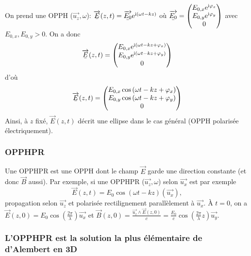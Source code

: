On prend une OPPH ($\vec{u_z},\omega$): $\ubar{\vec{E}}(z,t)=\ubar{\vec{E_0}}\rme^{\rmi\left(\omega t-kz\right)}$ où $\ubar{\vec{E_0}}=\begin{pmatrix}
    E_{0,x}\rme^{\rmi\varphi_x}\\E_{0,y}\rme^{\rmi\varphi_y}\\0
\end{pmatrix}$ avec $E_{0,x},E_{0,y}>0$. On a donc
\begin{equation*}
    \ubar{\vec{E}}(z,t)=\begin{pmatrix}
        E_{0,x}\rme^{\rmi\left(\omega t-kz+\varphi_x\right)}\\
        E_{0,y}\rme^{\rmi\left(\omega t-kz+\varphi_y\right)}\\
        0
    \end{pmatrix}
\end{equation*}
d'où
\begin{equation*}
    \ubar{\vec{E}}(z,t)=\begin{pmatrix}
        E_{0,x}\cos\left(\omega t-kz+\varphi_x\right)\\
        E_{0,y}\cos\left(\omega t-kz+\varphi_y\right)\\
        0
    \end{pmatrix}
\end{equation*}
Ainsi, à $z$ fixé, $\vec{E}(z,t)$ décrit une ellipse dans le cas général (OPPH polarisée électriquement).

\subsubsection{OPPHPR}
Une OPPHPR est une OPPH dont le champ $\vec{E}$ garde une direction constante (et donc $\vec{B}$ aussi). Par exemple, si une OPPHPR ($\vec{u_z},\omega$) selon $\vec{u_x}$ est par exemple
\begin{equation*}
    \boxed{
        \vec{E}(z,t)=E_0\cos(\omega t-kz)(\vec{u_x}),
    }
\end{equation*}
propagation selon $\vec{u_z}$ et polarisée rectilignement parallèlement à $\vec{u_x}$.
À $t=0$, on a $\vec{E}(z,0)=E_0\cos\left(\frac{2\pi}{\lambda}\right)\vec{u_x}$ et $\vec{B}(z,0)=\frac{\vec{u_z}\wedge\vec{E}(z,0)}{c}=\frac{E_0}{c}\cos\left(\frac{2\pi}{\lambda}z\right)\vec{u_y}$.

\subsubsection{L'OPPHPR est la solution la plus élémentaire de d'Alembert en 3D}

